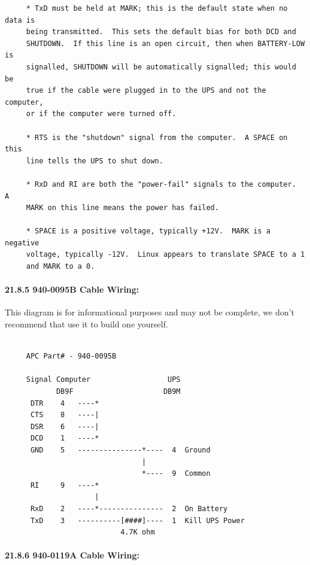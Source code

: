 \begin{verbatim}
     * TxD must be held at MARK; this is the default state when no data is
     being transmitted.  This sets the default bias for both DCD and
     SHUTDOWN.  If this line is an open circuit, then when BATTERY-LOW is
     signalled, SHUTDOWN will be automatically signalled; this would be
     true if the cable were plugged in to the UPS and not the computer,
     or if the computer were turned off.
     
     * RTS is the "shutdown" signal from the computer.  A SPACE on this
     line tells the UPS to shut down.
     
     * RxD and RI are both the "power-fail" signals to the computer.  A
     MARK on this line means the power has failed.
     
     * SPACE is a positive voltage, typically +12V.  MARK is a negative
     voltage, typically -12V.  Linux appears to translate SPACE to a 1
     and MARK to a 0.
\end{verbatim}
\normalsize

\label{940_002d0095B-Cable-Wiring}

\paragraph*{21.8.5 940-0095B Cable Wiring:}

\label{index-Cables-207}
This diagram is for informational purposes and may not be complete, we don't
recommend that use it to build one yourself. 

\footnotesize
\begin{verbatim}
     
     APC Part# - 940-0095B
     
     Signal Computer                  UPS
            DB9F                     DB9M
      DTR    4   ----*
      CTS    8   ----|
      DSR    6   ----|
      DCD    1   ----*
      GND    5   ---------------*----  4  Ground
                                |
                                *----  9  Common
      RI     9   ----*
                     |
      RxD    2   ----*---------------  2  On Battery
      TxD    3   ----------[####]----  1  Kill UPS Power
                           4.7K ohm
\end{verbatim}
\normalsize

\label{940_002d0119A-Cable-Wiring}

\paragraph*{21.8.6 940-0119A Cable Wiring:}

